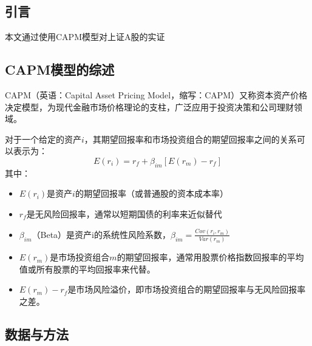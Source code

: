 \documentclass{xjtureport}
\begin{document}
\subsection{引言}
本文通过使用CAPM模型对上证A股的实证
\subsection{CAPM模型的综述}
CAPM（英语：Capital Asset Pricing Model，缩写：CAPM）又称资本资产价格决定模型，为现代金融市场价格理论的支柱，广泛应用于投资决策和公司理财领域。
\par 对于一个给定的资产$i$，其期望回报率和市场投资组合的期望回报率之间的关系可以表示为：
\begin{equation*}
    E(r_{i})=r_{f}+\beta _{{im}}[E(r_{m})-r_{f}]
\end{equation*}
其中：
\begin{itemize}
    \item $E(r_{i})$是资产$i$的期望回报率（或普通股的资本成本率）
    \item $r_{f}$是无风险回报率，通常以短期国债的利率来近似替代
    \item $\beta _{{im}}$（Beta）是资产i的系统性风险系数，$\beta_{im} = \frac {Cov(r_i,r_m)}{Var(r_m)}$
    \item $E(r_{m})$是市场投资组合$m$的期望回报率，通常用股票价格指数回报率的平均值或所有股票的平均回报率来代替。
    \item $E(r_{m})-r_{f}$是市场风险溢价，即市场投资组合的期望回报率与无风险回报率之差。
\end{itemize}
\subsection{数据与方法}
\end{document}
